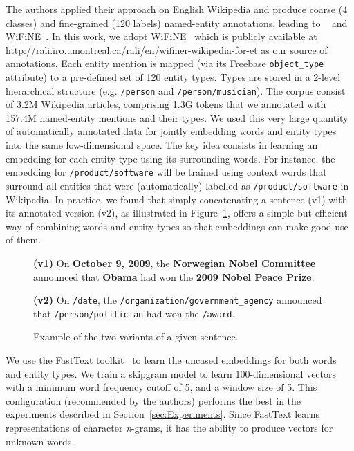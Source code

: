 \documentclass[11pt]{article}
\newcommand{\wifine}{WiFiNE}
\begin{document}
	The authors applied their approach on English Wikipedia and produce coarse (4 classes) and fine-grained (120 labels) named-entity annotations, leading to \winer~\cite{ghaddar2017winer} and \wifine~\cite{ghaddara2018wifine}. In this work, we adopt \wifine{ } which is publicly available at \url{http://rali.iro.umontreal.ca/rali/en/wifiner-wikipedia-for-et} as our source of annotations. Each entity mention is mapped (via its Freebase \texttt{object\_type} attribute) to a pre-defined set of 120 entity types. Types are stored in a 2-level hierarchical structure (e.g. \texttt{/person} and \texttt{/person/musician}). The corpus consist of 3.2M Wikipedia articles, comprising 1.3G  tokens that we annotated with 157.4M named-entity mentions and their types.
	We used this very large quantity of automatically annotated data for jointly embedding words and entity types into the same low-dimensional space.  The key idea consists in learning an embedding for each entity type using its surrounding words. For instance, the embedding for \texttt{/product/software} will be trained using context words that surround all entities that were (automatically) labelled as \texttt{/product/software} in Wikipedia. In practice, we found that simply concatenating a sentence (v1) with its annotated version (v2),  as illustrated in Figure~\ref{fig:corpus}, offers a simple but efficient way of combining words and entity types so that embeddings can make good use of them.
	
	\begin{figure}[!h]
		
		\begin{framed}
			\textbf{(v1)} On \textbf{October 9, 2009}, the \textbf{Norwegian Nobel Committee} announced that \textbf{Obama} had won the \textbf{2009 Nobel Peace Prize}.
			
			\textbf{(v2)} On \texttt{/date}, the \texttt{/organization/government\_agency} announced that \texttt{/person/politician} had won the \texttt{/award}.
		\end{framed}
		
		\caption{Example of the two variants of a given sentence.}
		\label{fig:corpus}
	\end{figure}
	
	


	
	
	We use the FastText toolkit~\cite{bojanowski2016enriching} to learn the uncased embeddings for both words and entity types. We train a skipgram model to learn 100-dimensional vectors with a minimum word frequency cutoff of 5, and a window size of 5. This configuration (recommended by the authors) performs the best in the experiments described in Section~\ref{sec:Experiments}. Since FastText learns representations of character \textit{n}-grams, it has the ability to produce vectors for unknown words. 
\end{document}

